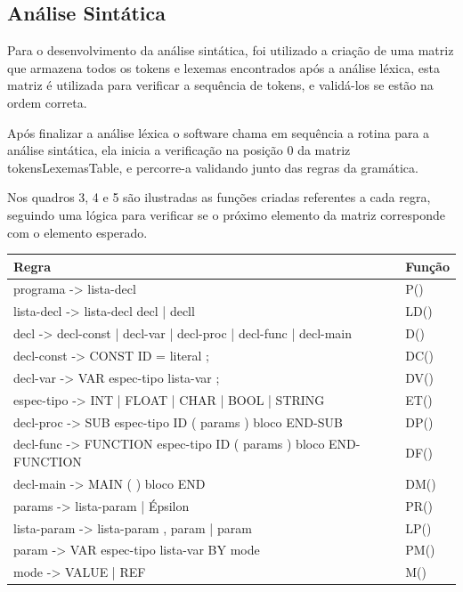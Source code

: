\documentclass[12pt,oneside,a4paper,chapter=TITLE,section=TITLE,sumario=tradicional]{abntex2}
\begin{document}
\begin{figure}[htb]
\end{figure} 

\subsection{Análise Sintática}
\label{subsec:analisesintatica}

Para o desenvolvimento da análise sintática, foi utilizado a criação de uma matriz que armazena todos os tokens e lexemas encontrados após a análise léxica, esta matriz é utilizada para verificar a sequência de tokens, e validá-los se estão na ordem correta.  

Após finalizar a análise léxica o software chama em sequência a rotina para a análise sintática, ela inicia a verificação na posição 0 da matriz tokensLexemasTable, e percorre-a validando junto das regras da gramática.  

Nos quadros 3, 4 e 5 são ilustradas as funções criadas referentes a cada regra, seguindo uma lógica para verificar se o próximo elemento da matriz corresponde com o elemento esperado. 

\begin{quadro}[htb]
    \centering
    \vspace{0.5cm}
    \begin{tabular}[h]{|p{13.0cm}|p{2.0cm}|}
        \hline
        \textbf{Regra} & \textbf{Função} \\ 
        \hline\hline
	programa -> lista-decl  & P()   \\ \hline 
	lista-decl -> lista-decl decl | decll  & LD()   \\ \hline 
	decl -> decl-const | decl-var | decl-proc | decl-func | decl-main  & D() \\ \hline
	decl-const -> CONST ID = literal ;  & DC()   \\ \hline 
	decl-var -> VAR espec-tipo lista-var ;  & DV()   \\ \hline 
	espec-tipo -> INT | FLOAT | CHAR | BOOL | STRING  & ET()   \\ \hline 
	decl-proc -> SUB espec-tipo ID ( params ) bloco END-SUB  & DP()   \\ \hline 
	decl-func -> FUNCTION espec-tipo ID ( params ) bloco END-FUNCTION  & DF()   \\ \hline 
	decl-main -> MAIN ( ) bloco END  & DM()   \\ \hline 
	params -> lista-param | Épsilon  & PR()   \\ \hline 
	lista-param -> lista-param , param | param  & LP()   \\ \hline 
	param -> VAR espec-tipo lista-var BY mode  & PM()   \\ \hline 
	mode -> VALUE | REF  & M()   \\ \hline 
    \end{tabular}
\end{quadro}
\end{document}
